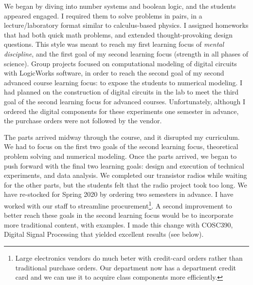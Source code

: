 \documentclass[../../../main.tex]{subfiles}
\begin{document}
We began by diving into number systems and boolean logic, and the students appeared engaged.  I required them to solve problems in pairs, in a lecture/laboratory format similar to calculus-based physics.  I assigned homeworks that had both quick math problems, and extended thought-provoking design questions.  This style was meant to reach my first learning focus of \textit{mental discipline}, and the first goal of my second learning focus (strength in all phases of science).  Group projects focused on computational modeling of digital circuits with LogicWorks software, in order to reach the second goal of my second advanced course learning focus: to expose the students to numerical modeling.  I had planned on the construction of digital circuits in the lab to meet the third goal of the second learning focus for advanced courses.  Unfortunately, although I ordered the digital components for these experiments one semester in advance, the purchase orders were not followed by the vendor.  \\ \hspace{0.1cm} 

The parts arrived midway through the course, and it disrupted my curriculum.  We had to focus on the first two goals of the second learning focus, theoretical problem solving and numerical modeling.  Once the parts arrived, we began to push forward with the final two learning goals: design and execution of technical experiments, and data analysis.  We completed our transistor radios while waiting for the other parts, but the students felt that the radio project took too long.  We have re-stocked for Spring 2020 by ordering two semesters in advance.  I have worked with our staff to streamline procurement\footnote{Large electronics vendors do much beter with credit-card orders rather than traditional purchase orders.  Our department now has a department credit card and we can use it to acquire class components more efficiently.}.  A second improvement to better reach these goals in the second learning focus would be to incorporate more traditional content, with examples.  I made this change with COSC390, Digital Signal Processing that yielded excellent results (see below).\\ \hspace{0.1cm}
\end{document}
